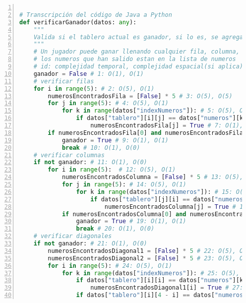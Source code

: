 \documentclass[10pt,twocolumn]{article}
\begin{document}
\begin{lstlisting}[language=python, caption={Algoritmo verificarGanador}, label={verificarGanador}, captionpos=b, basicstyle=\footnotesize\ttfamily, numbers=left, numberstyle=\tiny, numbersep=5pt, stepnumber=1, numberblanklines=true, frame=single, framesep=2mm, rulesepcolor=\color{black}]

# Transcripción del código de Java a Python
def verificarGanador(datos: any):
	"""
	Valida si el tablero actual es ganador, si lo es, se agrega a la lista de ganadores del estado
	"""
	# Un jugador puede ganar llenando cualquier fila, columna, diagonales o cuatro esquinas solamente, los numeros que se encuentran en el centro no cuentan
	# los numeros que han salido estan en la lista de numeros
	# id: complejidad temporal, complejidad espacial(si aplica) osea si se esta usando memoria extra
	ganador = False # 1: O(1), O(1)
	# verificar filas
	for i in range(5): # 2: O(5), O(1)
		numerosEncontradosFila = [False] * 5 # 3: O(5), O(5)
		for j in range(5): # 4: O(5), O(1)
			for k in range(datos["indexNumeros"]): # 5: O(5), O(1)
				if datos["tablero"][i][j] == datos["numeros"][k]: # 6: O(1), O(0)
					numerosEncontradosFila[j] = True # 7: O(1), O(1)
		if numerosEncontradosFila[0] and numerosEncontradosFila[1] and numerosEncontradosFila[2] and numerosEncontradosFila[3] and numerosEncontradosFila[4]: # 8: O(1), O(0)
			ganador = True # 9: O(1), O(1)
			break # 10: O(1), O(0)
	# verificar columnas
	if not ganador: # 11: O(1), O(0)
		for i in range(5):  # 12: O(5), O(1)
			numerosEncontradosColumna = [False] * 5 # 13: O(5), O(5)
			for j in range(5): # 14: O(5), O(1)
				for k in range(datos["indexNumeros"]): # 15: O(5), O(1)
					if datos["tablero"][j][i] == datos["numeros"][k]: # 16: O(1), O(0)
						numerosEncontradosColumna[j] = True # 17: O(1), O(1)
			if numerosEncontradosColumna[0] and numerosEncontradosColumna[1] and numerosEncontradosColumna[2] and numerosEncontradosColumna[3] and numerosEncontradosColumna[4]: # 18: O(1), O(0)
				ganador = True # 19: O(1), O(1)
				break # 20: O(1), O(0)
	# verificar diagonales
	if not ganador: # 21: O(1), O(0)
		numerosEncontradosDiagonal1 = [False] * 5 # 22: O(5), O(5)
		numerosEncontradosDiagonal2 = [False] * 5 # 23: O(5), O(5)
		for i in range(5): # 24: O(5), O(1)
			for k in range(datos["indexNumeros"]): # 25: O(5), O(1)
				if datos["tablero"][i][i] == datos["numeros"][k]: # 26: O(1), O(0)
					numerosEncontradosDiagonal1[i] = True # 27: O(1), O(1)
				if datos["tablero"][i][4 - i] == datos["numeros"][k]: # 28: O(1), O(0)

\end{lstlisting}
\end{document}
